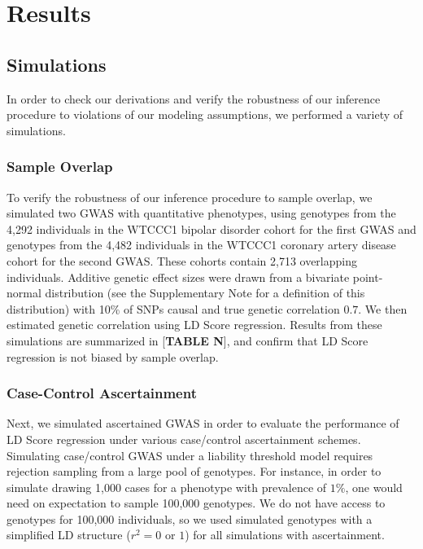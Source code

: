 \documentclass[11pt]{article}
\begin{document}
\section{Results}\label{Results}


\subsection{Simulations}
In order to check our derivations and verify the robustness of our inference procedure to 
violations of our modeling assumptions, we performed a variety of simulations. 

\subsubsection{Sample Overlap}
To verify the robustness of our inference procedure to sample overlap, 
we simulated two GWAS with quantitative phenotypes,
using genotypes from the 4,292 individuals in the WTCCC1 bipolar disorder cohort for the first GWAS
and genotypes from the 4,482 individuals in the WTCCC1 coronary artery disease cohort for the second GWAS.
These cohorts contain 2,713 overlapping individuals. 
Additive genetic effect sizes were drawn from a bivariate point-normal distribution 
(see the Supplementary Note for a definition of this distribution) 
with 10\% of SNPs causal and true genetic correlation $0.7$.
We then estimated genetic correlation using LD Score regression.
Results from these simulations are summarized in [\textbf{TABLE N}],
and confirm that LD Score regression is not biased by sample overlap.

\subsubsection{Case-Control Ascertainment}
Next, we simulated ascertained GWAS in order to evaluate the performance of 
LD Score regression under various case/control ascertainment schemes.
Simulating case/control GWAS under a liability threshold model requires rejection
sampling from a large pool of genotypes.
For instance, in order to simulate drawing 1,000 cases 
for a phenotype with prevalence of $1\%$, 
one would need on expectation to sample 100,000 genotypes.
We do not have access to genotypes for 100,000 individuals, 
so we used simulated genotypes with a simplified LD structure 
($r^2=0$ or $1$) for all simulations with ascertainment.
\end{document}
